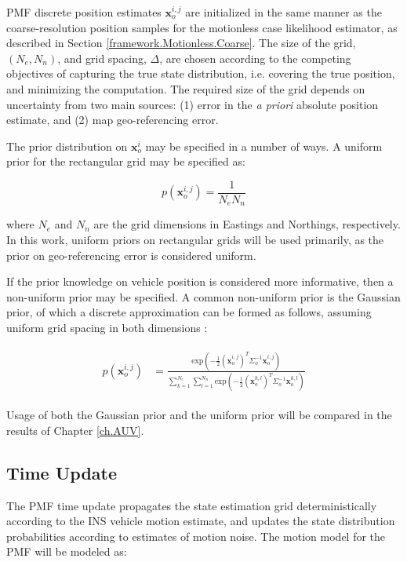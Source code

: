 PMF discrete position estimates $\mathbf{x}_o^{i,j}$ are initialized in the same manner as the coarse-resolution position samples for the motionless case likelihood estimator, as described in Section \ref{framework.Motionless.Coarse}.
The size of the grid, $(N_e, N_n)$, and grid spacing, $\Delta$, are chosen according to the competing objectives of capturing the true state distribution, i.e. covering the true position, and minimizing the computation.
The required size of the grid depends on uncertainty from two main sources: (1) error in the \emph{a priori} absolute position estimate, and (2) map geo-referencing error. 

The prior distribution on $\mathbf{x}_o^{i}$ may be specified in a number of ways.
A uniform prior for the rectangular grid may be specified as:

\begin{equation}
p(\mathbf{x}_o^{i,j}) = \frac{1}{N_e N_n} 
\label{eq:uniformPrior}
\end{equation}

\noindent where $N_e$ and $N_n$ are the grid dimensions in Eastings and Northings, respectively. In this work, uniform priors on rectangular grids will be used primarily, as the prior on geo-referencing error is considered uniform.

If the prior knowledge on vehicle position is considered more informative, then a non-uniform prior may be specified.  A common non-uniform prior is the Gaussian prior, of which a discrete approximation can be formed as follows, assuming uniform grid spacing in both dimensions :

\begin{align}
\begin{split}
p(\mathbf{x}_o^{i,j}) &= \frac {\text{exp}(-\frac{1}{2}(\mathbf{x}_o^{i,j})^{T}\Sigma_o^{-1}\mathbf{x}_o^{i,j})}{\sum_{k=1}^{N_e} \sum_{l=1}^{N_n} \text{exp}(-\frac{1}{2}(\mathbf{x}_o^{k,l})^{T}\Sigma_o^{-1}\mathbf{x}_o^{k,l})}
\end{split}
\label{eq:nonuniformPrior}
\end{align}

Usage of both the Gaussian prior and the uniform prior will be compared in the results of Chapter \ref{ch.AUV}.

\subsection{Time Update}
\label{framework.PMF.Time}

The PMF time update propagates the state estimation grid deterministically according to the INS vehicle motion estimate, and updates the state distribution probabilities according to estimates of motion noise.
The motion model for the PMF will be modeled as:

